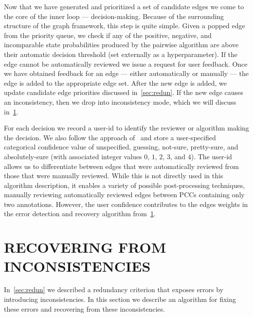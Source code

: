 Now that we have generated and prioritized a set of candidate edges we come to the core of the inner loop ---
  decision-making.
Because of the surrounding structure of the graph framework, this step is quite simple.
Given a popped edge from the priority queue, we check if any of the positive, negative, and incomparable state
  probabilities produced by the pairwise algorithm are above their automatic decision threshold (set externally as
  a hyperparameter).
If the edge cannot be automatically reviewed we issue a request for user feedback.
Once we have obtained feedback for an edge --- either automatically or manually --- the edge is added to the
  appropriate edge set.
After the new edge is added, we update candidate edge priorities discussed in~\cref{sec:redun}.
If the new edge causes an inconsistency, then we drop into inconsistency mode, which we will discuss
  in~\cref{sec:incon}.

For each decision we record a user-id to identify the reviewer or algorithm making the decision.
We also follow the approach of~\cite{branson_visual_2010} and store a user-specified categorical confidence value
  of unspecified, guessing, not-sure, pretty-sure, and absolutely-sure (with associated integer values $0$, $1$,
  $2$, $3$, and $4$).
The user-id allows us to differentiate between edges that were automatically reviewed from those that were
  manually reviewed.
While this is not directly used in this algorithm description, it enables a variety of possible post-processing
  techniques, \eg{} manually reviewing automatically reviewed edges between PCCs containing only two annotations.
However, the user confidence contributes to the edges weights in the error detection and recovery algorithm
  from~\cref{sec:incon}.


\section{RECOVERING FROM INCONSISTENCIES}\label{sec:incon}

In~\cref{sec:redun} we described a redundancy criterion that exposes errors by introducing inconsistencies.
In this section we describe an algorithm for fixing these errors and recovering from these inconsistencies.

